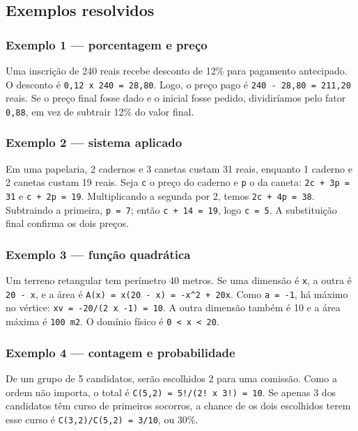 \documentclass[11pt,a4paper]{article}
\begin{document}
\subsection*{Exemplos resolvidos}

\subsubsection*{Exemplo 1 — porcentagem e preço}

Uma inscrição de 240 reais recebe desconto de 12\% para pagamento antecipado. O desconto é \texttt{0,12 x 240 = 28,80}. Logo, o preço pago é \texttt{240 - 28,80 = 211,20} reais. Se o preço final fosse dado e o inicial fosse pedido, dividiríamos pelo fator \texttt{0,88}, em vez de subtrair 12\% do valor final.

\subsubsection*{Exemplo 2 — sistema aplicado}

Em uma papelaria, 2 cadernos e 3 canetas custam 31 reais, enquanto 1 caderno e 2 canetas custam 19 reais. Seja \texttt{c} o preço do caderno e \texttt{p} o da caneta: \texttt{2c + 3p = 31} e \texttt{c + 2p = 19}. Multiplicando a segunda por 2, temos \texttt{2c + 4p = 38}. Subtraindo a primeira, \texttt{p = 7}; então \texttt{c + 14 = 19}, logo \texttt{c = 5}. A substituição final confirma os dois preços.

\subsubsection*{Exemplo 3 — função quadrática}

Um terreno retangular tem perímetro 40 metros. Se uma dimensão é \texttt{x}, a outra é \texttt{20 - x}, e a área é \texttt{A(x) = x(20 - x) = -x\textasciicircum{}2 + 20x}. Como \texttt{a = -1}, há máximo no vértice: \texttt{xv = -20/(2 x -1) = 10}. A outra dimensão também é 10 e a área máxima é \texttt{100 m2}. O domínio físico é \texttt{0 < x < 20}.

\subsubsection*{Exemplo 4 — contagem e probabilidade}

De um grupo de 5 candidatos, serão escolhidos 2 para uma comissão. Como a ordem não importa, o total é \texttt{C(5,2) = 5!/(2! x 3!) = 10}. Se apenas 3 dos candidatos têm curso de primeiros socorros, a chance de os dois escolhidos terem esse curso é \texttt{C(3,2)/C(5,2) = 3/10}, ou 30\%.
\end{document}
